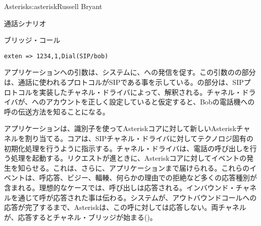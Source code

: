 \begin{aosachapter}{Asterisk}{s:asterisk}{Russell Bryant}
\begin{aosasect1}{通話シナリオ}
\begin{aosasect2}{ブリッジ・コール}
\begin{verbatim}
exten => 1234,1,Dial(SIP/bob)
\end{verbatim}

\noindent {}アプリケーションへの引数は、システムに、への発信を促す。この引数のの部分は、通話に使われるプロトコルがSIPである事を示している。の部分は、SIPプロトコルを実装したチャネル・ドライバによって、解釈される。チャネル・ドライバが、へのアカウントを正しく設定していると仮定すると、Bobの電話機への呼の伝送方法を知ることになる。

アプリケーションは、識別子を使ってAsteriskコアに対して新しいAsteriskチャネルを割り当てる。コアは、SIPチャネル・ドライバに対してテクノロジ固有の初期化処理を行うように指示する。チャネル・ドライバは、電話の呼び出しを行う処理を起動する。リクエストが進ときに、Asteriskコアに対してイベントの発生を知らせる。これは、さらに、アプリケーションまで届けられる。これらのイベントは、呼応答、ビジー、輻輳、何らかの理由での拒絶など多くの応答種別が含まれる。理想的なケースでは、呼び出しは応答される。インバウンド・チャネルを通じて呼が応答された事は伝わる。システムが、アウトバウンドコールへの応答が完了するまで、Asteriskは、この呼に対しては応答しない。両チャネルが、応答するとチャネル・ブリッジが始まる()。


\end{aosasect2}
\end{aosasect1}
\end{aosachapter}
